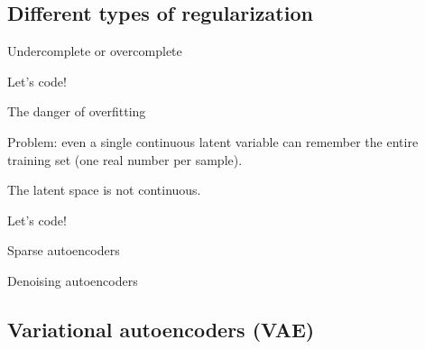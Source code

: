 \documentclass{beamer}
\begin{document}
  \subsection{Different types of regularization}

  \begin{frame}{Undercomplete or overcomplete}
    
  \end{frame}

  \begin{frame}{Let's code!}


    
  \end{frame}

  \begin{frame}{The danger of overfitting}
    
    Problem: even a single continuous latent variable can remember the entire training set (one real number per sample).

    The latent space is not continuous.

  \end{frame}

  \begin{frame}{Let's code!}
    

  \end{frame}

  \begin{frame}{Sparse autoencoders}
    
  \end{frame}

  \begin{frame}{Denoising autoencoders}

    \cite{Vincent2010}
    
  \end{frame}

  \subsection{Variational autoencoders (VAE)}
\end{document}
